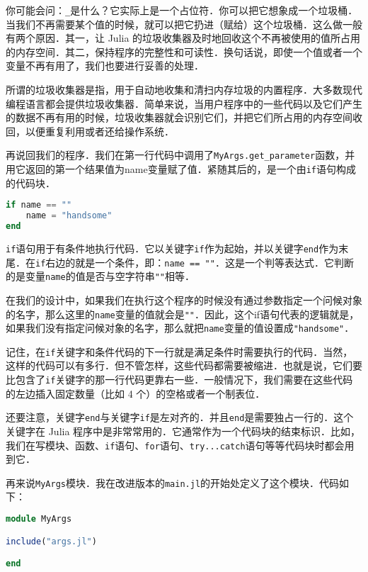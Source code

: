 你可能会问：\verb|_|是什么？它实际上是一个占位符．你可以把它想象成一个垃圾桶．当我们不再需要某个值的时候，就可以把它扔进（赋给）这个垃圾桶．这么做一般有两个原因．其一，让 Julia 的垃圾收集器及时地回收这个不再被使用的值所占用的内存空间．其二，保持程序的完整性和可读性．换句话说，即使一个值或者一个变量不再有用了，我们也要进行妥善的处理．

所谓的垃圾收集器是指，用于自动地收集和清扫内存垃圾的内置程序．大多数现代编程语言都会提供垃圾收集器．简单来说，当用户程序中的一些代码以及它们产生的数据不再有用的时候，垃圾收集器就会识别它们，并把它们所占用的内存空间收回，以便重复利用或者还给操作系统．

再说回我们的程序．我们在第一行代码中调用了\verb|MyArgs.get_parameter|函数，并用它返回的第一个结果值为name变量赋了值．紧随其后的，是一个由\verb|if|语句构成的代码块．

\begin{lstlisting}[language=julia]
if name == "" 
    name = "handsome" 
end
\end{lstlisting}

\verb|if|语句用于有条件地执行代码．它以关键字\verb|if|作为起始，并以关键字\verb|end|作为末尾．在\verb|if|右边的就是一个条件，即：\verb|name == ""|．这是一个判等表达式．它判断的是变量\verb|name|的值是否与空字符串\verb|""|相等．

在我们的设计中，如果我们在执行这个程序的时候没有通过参数指定一个问候对象的名字，那么这里的\verb|name|变量的值就会是\verb|""|．因此，这个if语句代表的逻辑就是，如果我们没有指定问候对象的名字，那么就把\verb|name|变量的值设置成\verb|"handsome"|．

记住，在\verb|if|关键字和条件代码的下一行就是满足条件时需要执行的代码．当然，这样的代码可以有多行．但不管怎样，这些代码都需要被缩进．也就是说，它们要比包含了\verb|if|关键字的那一行代码更靠右一些．一般情况下，我们需要在这些代码的左边插入固定数量（比如 4 个）的空格或者一个制表位．

还要注意，关键字\verb|end|与关键字\verb|if|是左对齐的．并且\verb|end|是需要独占一行的．这个关键字在 Julia 程序中是非常常用的．它通常作为一个代码块的结束标识．比如，我们在写模块、函数、\verb|if|语句、\verb|for|语句、\verb|try...catch|语句等等代码块时都会用到它．

再来说\verb|MyArgs|模块．我在改进版本的\verb|main.jl|的开始处定义了这个模块．代码如下：

\begin{lstlisting}[language=julia]
module MyArgs

include("args.jl")

end
\end{lstlisting}

